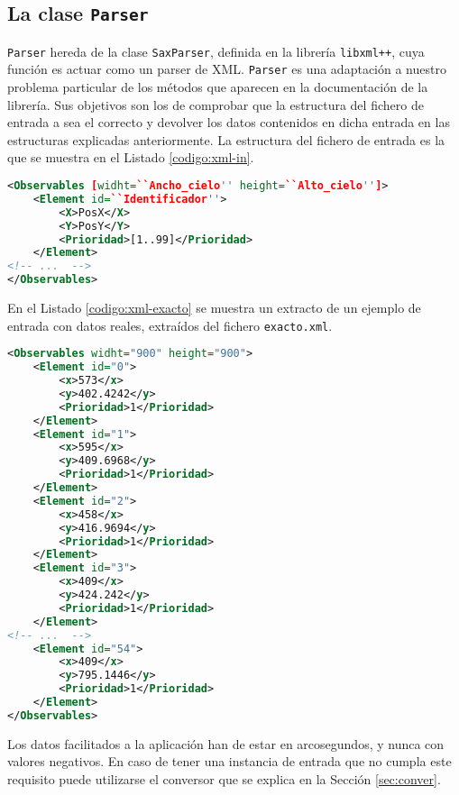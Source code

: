 \subsection{La clase \texttt{Parser}}
\texttt{Parser} hereda de la clase \texttt{SaxParser}, definida en la librería
\texttt{libxml++}, cuya función es actuar como un parser de XML. 
\texttt{Parser} es una adaptación a nuestro problema particular de los métodos que aparecen en la
documentación de la librería. Sus objetivos son los de comprobar que la
estructura del fichero de entrada a \CSUO{} sea el correcto y devolver los
datos contenidos en dicha entrada en las estructuras explicadas anteriormente.
La estructura del fichero de entrada es la que se muestra en el Listado
\ref{codigo:xml-in}.

\begin{lstlisting}[float=tpb,
                   numbers=none,
                   language=XML,
                   caption={Estructura de los ficheros de entrada para \CSUO{}},
                   label={codigo:xml-in}]
<Observables [widht=``Ancho_cielo'' height=``Alto_cielo'']>
    <Element id=``Identificador''>
        <X>PosX</X>
        <Y>PosY</Y>
        <Prioridad>[1..99]</Prioridad>
    </Element>
<!-- ...  -->
</Observables>
\end{lstlisting}

En el Listado \ref{codigo:xml-exacto} se muestra un extracto de un ejemplo de entrada con datos
reales, extraídos del fichero \texttt{exacto.xml}.

\begin{lstlisting}[float=tpb,
                   numbers=none,
                   language=XML,
                   caption={Ejemplo de entrada para \CSUO{},
                   extraído de \texttt{exacto.xml}},
                   label={codigo:xml-exacto}]
<Observables widht="900" height="900">
	<Element id="0">
		<x>573</x>
		<y>402.4242</y>
		<Prioridad>1</Prioridad>
	</Element>
	<Element id="1">
		<x>595</x>
		<y>409.6968</y>
		<Prioridad>1</Prioridad>
	</Element>
	<Element id="2">
		<x>458</x>
		<y>416.9694</y>
		<Prioridad>1</Prioridad>
	</Element>
	<Element id="3">
		<x>409</x>
		<y>424.242</y>
		<Prioridad>1</Prioridad>
	</Element>
<!-- ...  -->
	<Element id="54">
		<x>409</x>
		<y>795.1446</y>
		<Prioridad>1</Prioridad>
	</Element>
</Observables>
\end{lstlisting}

Los datos facilitados a la aplicación han de estar en arcosegundos, y nunca con
valores negativos. 
En caso de tener una instancia de entrada que no cumpla este requisito puede
utilizarse el conversor que se explica en la Sección \ref{sec:conver}.

